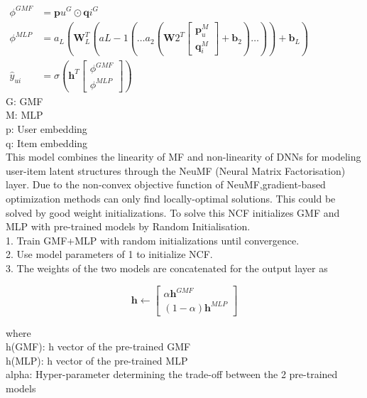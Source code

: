 \documentclass[sigconf]{acmart}
\begin{document}
$\begin{aligned} \phi^{G M F} &=\mathbf{p}{u}^{G} \odot \mathbf{q}{i}^{G} \\ \phi^{M L P} &=a_{L}\left(\mathbf{W}_{L}^{T}\left(a{L-1}\left(\ldots a_{2}\left(\mathbf{W}{2}^{T}\left[\begin{array}{l}\mathbf{p}_{u}^{M} \\ \mathbf{q}_{i}^{M}\end{array}\right]+\mathbf{b}_{2}\right) \ldots\right)\right)+\mathbf{b}_{L}\right) \\ \hat{y}_{u i} &=\sigma\left(\mathbf{h}^{T}\left[\begin{array}{l}\phi^{G M F} \\ \phi^{M L P}\end{array}\right]\right) \end{aligned}$\\
G: GMF\\
M: MLP\\
p: User embedding\\
q: Item embedding\\
This model combines the linearity of MF and non-linearity of DNNs for modeling user-item latent structures through the NeuMF (Neural Matrix Factorisation) layer.
Due to the non-convex objective function of NeuMF,gradient-based optimization methods can only find locally-optimal solutions. This could be solved by good weight initializations. To solve this NCF initializes GMF and MLP with pre-trained models by Random Initialisation.\\
1. Train GMF+MLP with random initializations until convergence. \\
2. Use model parameters of 1 to initialize NCF.\\
3. The weights of the two models are concatenated for the output layer as

$$
\mathbf{h} \leftarrow\left[\begin{array}{c}\alpha \mathbf{h}^{G M F} \\ (1-\alpha) \mathbf{h}^{M L P}\end{array}\right]
$$

where\\
h(GMF): h vector of the pre-trained GMF\\
h(MLP): h vector of the pre-trained MLP\\
alpha: Hyper-parameter determining the trade-off between the 2 pre-trained models
\end{document}
